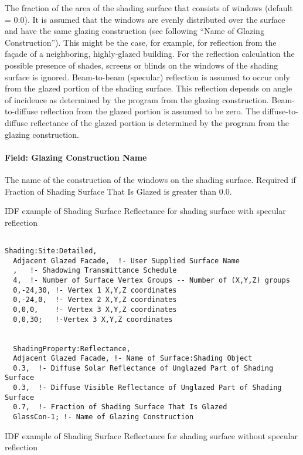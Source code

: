 The fraction of the area of the shading surface that consists of windows (default = 0.0). It is assumed that the windows are evenly distributed over the surface and have the same glazing construction (see following ``Name of Glazing Construction''). This might be the case, for example, for reflection from the façade of a neighboring, highly-glazed building. For the reflection calculation the possible presence of shades, screens or blinds on the windows of the shading surface is ignored. Beam-to-beam (specular) reflection is assumed to occur only from the glazed portion of the shading surface. This reflection depends on angle of incidence as determined by the program from the glazing construction. Beam-to-diffuse reflection from the glazed portion is assumed to be zero. The diffuse-to-diffuse reflectance of the glazed portion is determined by the program from the glazing construction.

\paragraph{Field: Glazing Construction Name}\label{field-glazing-construction-name}

The name of the construction of the windows on the shading surface. Required if Fraction of Shading Surface That Is Glazed is greater than 0.0.

IDF example of Shading Surface Reflectance for shading surface with specular reflection

\begin{lstlisting}

Shading:Site:Detailed,
  Adjacent Glazed Facade,  !- User Supplied Surface Name
  ,   !- Shadowing Transmittance Schedule
  4,  !- Number of Surface Vertex Groups -- Number of (X,Y,Z) groups
  0,-24,30, !- Vertex 1 X,Y,Z coordinates
  0,-24,0,  !- Vertex 2 X,Y,Z coordinates
  0,0,0,    !- Vertex 3 X,Y,Z coordinates
  0,0,30;   !-Vertex 3 X,Y,Z coordinates


  ShadingProperty:Reflectance,
  Adjacent Glazed Facade, !- Name of Surface:Shading Object
  0.3,  !- Diffuse Solar Reflectance of Unglazed Part of Shading Surface
  0.3,  !- Diffuse Visible Reflectance of Unglazed Part of Shading Surface
  0.7,  !- Fraction of Shading Surface That Is Glazed
  GlassCon-1; !- Name of Glazing Construction
\end{lstlisting}

IDF example of Shading Surface Reflectance for shading surface without specular reflection

